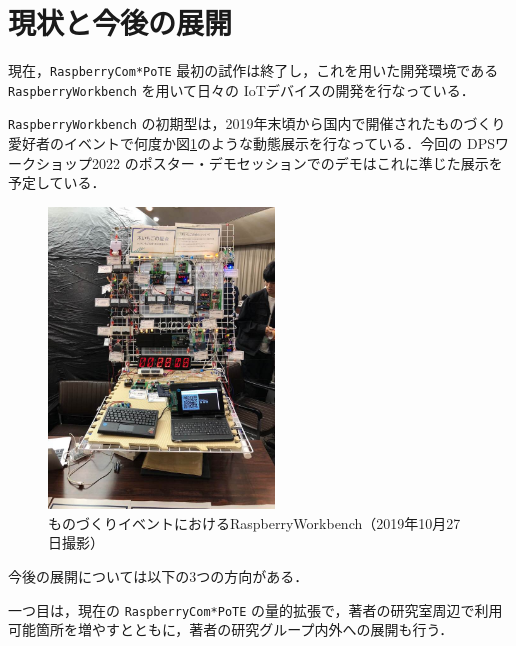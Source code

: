 
\section{現状と今後の展開}

\label{sec:07nextstep}

現在，{\tt Raspberry\-Com*PoTE} 最初の試作は終了し，これを用いた開発環境である {\tt Raspberry\-Workbench} を用いて日々の IoTデバイスの開発を行なっている．


{\tt Raspberry\-Workbench} の初期型は，2019年末頃から国内で開催されたものづくり愛好者のイベントで何度か図\ref{RaspberryWorkbench}のような動態展示を行なっている．今回の DPSワークショップ2022 のポスター・デモセッションでのデモはこれに準じた展示を予定している．

\begin{figure}[H]
\centering
\includegraphics[width=6cm]{figspics/RaspberryWorkbench2.jpg}
\caption{ものづくりイベントにおける{RaspberryWorkbench}（2019年10月27日撮影）}
\label{RaspberryWorkbench}
\end{figure}

今後の展開については以下の3つの方向がある．

一つ目は，現在の {\tt Raspberry\-Com*PoTE} の量的拡張で，著者の研究室周辺で利用可能箇所を増やすとともに，著者の研究グループ内外への展開も行う．


